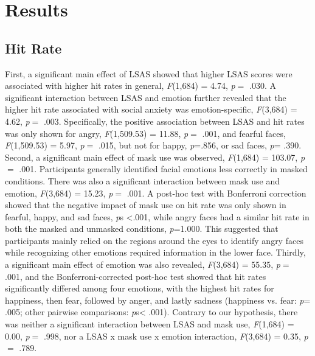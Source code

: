 \section{Results}
\newcommand{\Ftest}[4]
{\textit{F}(#1,#2) = #3, \textit{p}$=$
#4}
\subsection{Hit Rate}
First, a significant main effect of LSAS showed that higher LSAS scores were associated with higher hit rates in general, \Ftest{1}{684}{4.74}{.030}. A significant interaction between LSAS and emotion further revealed that the higher hit rate associated with social anxiety was emotion-specific, \Ftest{3}{684}{4.62}{.003}. Specifically, the positive association between LSAS and hit rates was only shown for angry, \Ftest{1}{509.53}{11.88}{.001}, and fearful faces, \Ftest{1}{509.53}{5.97}{.015}, but not for happy, \textit{p}=.856, or sad faces, \textit{p}= .390. Second, a significant main effect of mask use was observed, \Ftest{1}{684}{103.07}{.001}. Participants generally identified facial emotions less correctly in masked conditions. There was also a significant interaction between mask use and emotion, \Ftest{3}{684}{15.23}{.001}. A post-hoc test with Bonferroni correction showed that the negative impact of mask use on hit rate was only shown in fearful, happy, and sad faces, \textit{p}s <.001, while angry faces had a similar hit rate in both the masked and unmasked conditions, \textit{p}=1.000. This suggested that participants mainly relied on the regions around the eyes to identify angry faces while recognizing other emotions required information in the lower face. Thirdly, a significant main effect of emotion was also revealed, \Ftest{3}{684}{55.35}{.001}, and the Bonferroni-corrected post-hoc test showed that hit rates significantly differed among four emotions, with the highest hit rates for happiness, then fear, followed by anger, and lastly sadness (happiness vs. fear: \textit{p}= .005; other pairwise comparisons: \textit{p}s< .001). Contrary to our hypothesis, there was neither a significant interaction between LSAS and mask use, \Ftest{1}{684}{0.00}{.998}, nor a LSAS x mask use x emotion interaction, \Ftest{3} {684}{0.35}{.789}.

